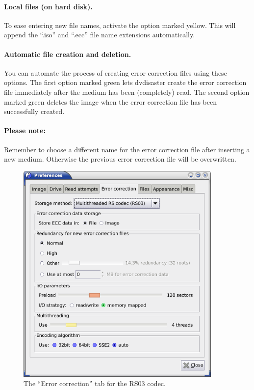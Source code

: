\paragraph{Local files (on hard disk).} To ease entering new file names,
activate the option marked yellow.
This will append the ``.iso'' and ``.ecc'' file name extensions automatically.

\paragraph{Automatic file creation and deletion.} You can automate the
process of creating error correction files using these options. The
first option marked green lets dvdisaster create the error correction
file immediately after the medium has been (completely) read.
The second option marked green deletes the image when the error correction
file has been successfully created.

\bigskip

\paragraph{Please note:} Remember to choose a different name for the error
correction file after inserting a new medium. Otherwise the
previous error correction file will be overwritten. 

\newpage

\begin{figure}[h]
\centerline{\includegraphics[width=0.9\textwidth]{screenshots/eccfile-prefs-ecc3-adv.png}}
\caption{The ``Error correction'' tab for the RS03 codec.}  
\label{howto-eccfile-prefs-ecc3-image-adv}
\end{figure}

